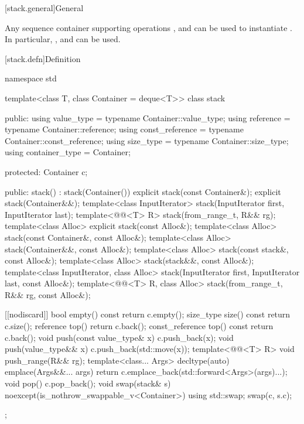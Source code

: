 [stack.general]{General}

\pnum
{}%
Any sequence container supporting operations
,
and
can be used to instantiate
.
In particular,
,
and
can be used.

[stack.defn]{Definition}

\begin{codeblock}
namespace std {
  template<class T, class Container = deque<T>>
  class stack {
  public:
    using value_type      = typename Container::value_type;
    using reference       = typename Container::reference;
    using const_reference = typename Container::const_reference;
    using size_type       = typename Container::size_type;
    using container_type  = Container;

  protected:
    Container c;

  public:
    stack() : stack(Container()) {}
    explicit stack(const Container&);
    explicit stack(Container&&);
    template<class InputIterator> stack(InputIterator first, InputIterator last);
    template<@@<T> R> stack(from_range_t, R&& rg);
    template<class Alloc> explicit stack(const Alloc&);
    template<class Alloc> stack(const Container&, const Alloc&);
    template<class Alloc> stack(Container&&, const Alloc&);
    template<class Alloc> stack(const stack&, const Alloc&);
    template<class Alloc> stack(stack&&, const Alloc&);
    template<class InputIterator, class Alloc>
      stack(InputIterator first, InputIterator last, const Alloc&);
    template<@@<T> R, class Alloc>
      stack(from_range_t, R&& rg, const Alloc&);

    [[nodiscard]] bool empty() const    { return c.empty(); }
    size_type size()  const             { return c.size(); }
    reference         top()             { return c.back(); }
    const_reference   top() const       { return c.back(); }
    void push(const value_type& x)      { c.push_back(x); }
    void push(value_type&& x)           { c.push_back(std::move(x)); }
    template<@@<T> R>
      void push_range(R&& rg);
    template<class... Args>
      decltype(auto) emplace(Args&&... args)
        { return c.emplace_back(std::forward<Args>(args)...); }
    void pop()                          { c.pop_back(); }
    void swap(stack& s) noexcept(is_nothrow_swappable_v<Container>)
      { using std::swap; swap(c, s.c); }
  };

}
\end{codeblock}
